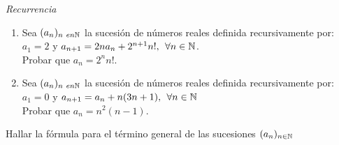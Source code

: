 \separador

\textit{Recurrencia}


\ejercicio
\begin{enumerate}[label=\roman*)]
	\item
	      Sea $(a_n)_{n\ en \mathbb N}$ la sucesión de números reales definida recursivamente por:\\
	      $a_1 = 2$ y $a_{n+1} = 2 n a_n+ 2^{n+1}n!,\, \;\forall n \in \mathbb N$.\\
	      Probar que $a_n = 2^n n!$.\\

	\item
	      Sea $(a_n)_{n\ en \mathbb N}$ la sucesión de números reales definida recursivamente por:\\
	      $a_1 = 0$ y $a_{n+1} = a_n + n(3n + 1),\, \;\forall n \in \mathbb N$\\
	      Probar que $a_n = n^2 (n-1)$.\\

\end{enumerate}

\ejercicio
Hallar la fórmula para el término general de las sucesiones $(a_n)_{n \in \mathbb N}$

\ejercicio

\update

